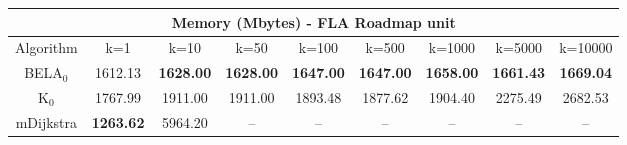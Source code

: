 \begin{tabular}{c|cccccccc}\toprule
\multicolumn{9}{c}{Memory (Mbytes) - FLA Roadmap unit}\\ \midrule
Algorithm & k=1 & k=10 & k=50 & k=100 & k=500 & k=1000 & k=5000 & k=10000 \\ \midrule
BELA$_0$ & 1612.13 & \textbf{1628.00} & \textbf{1628.00} & \textbf{1647.00} & \textbf{1647.00} & \textbf{1658.00} & \textbf{1661.43} & \textbf{1669.04} \\
K$_0$ & 1767.99 & 1911.00 & 1911.00 & 1893.48 & 1877.62 & 1904.40 & 2275.49 & 2682.53 \\
mDijkstra & \textbf{1263.62} & 5964.20 & -- & -- & -- & -- & -- & -- \\ \bottomrule 
\end{tabular}
